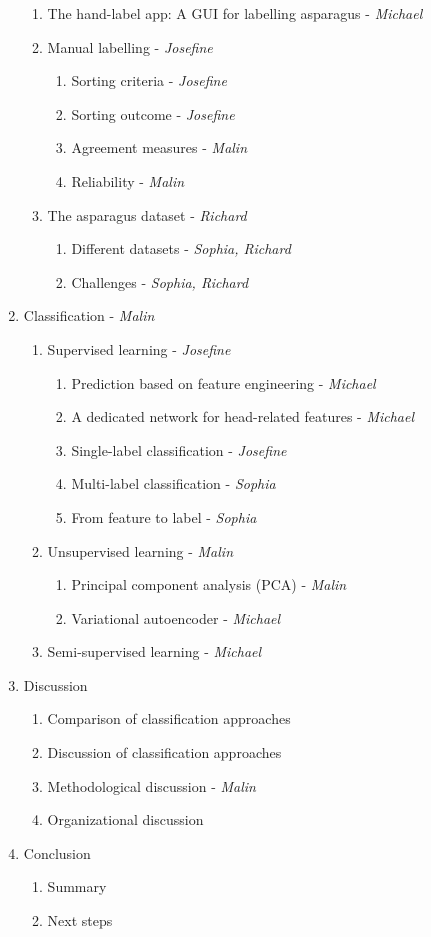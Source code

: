 \begin{enumerate}
\begin{enumerate}
	\item The hand-label app: A GUI for labelling asparagus - \textit{Michael}
	\item Manual labelling - \textit{Josefine}
		\begin{enumerate}
		\item Sorting criteria - \textit{Josefine}
		\item Sorting outcome - \textit{Josefine}
		\item Agreement measures - \textit{Malin}
		\item Reliability - \textit{Malin}
		\end{enumerate}
	\item The asparagus dataset - \textit{Richard}
		\begin{enumerate}
		\item Different datasets - \textit{Sophia, Richard}
		\item Challenges - \textit{Sophia, Richard}
		\end{enumerate}
	\end{enumerate}
\item Classification - \textit{Malin}
	\begin{enumerate}
	\item Supervised learning - \textit{Josefine}
		\begin{enumerate}
		\item Prediction based on feature engineering - \textit{Michael}
		\item A dedicated network for head-related features - \textit{Michael}
		\item Single-label classification - \textit{Josefine}
		\item Multi-label classification - \textit{Sophia}
		\item From feature to label - \textit{Sophia}
		\end{enumerate}
	\item Unsupervised learning - \textit{Malin}
		\begin{enumerate}
		\item Principal component analysis (PCA) - \textit{Malin}
		\item Variational autoencoder - \textit{Michael}
		\end{enumerate}
	\item Semi-supervised learning - \textit{Michael}
	\end{enumerate}
\item Discussion
	\begin{enumerate}
	\item Comparison of classification approaches
	\item Discussion of classification approaches
	\item Methodological discussion - \textit{Malin}
	\item Organizational discussion
	\end{enumerate}
\item Conclusion
	\begin{enumerate}
	\item Summary
	\item Next steps
	\end{enumerate}
\end{enumerate}
